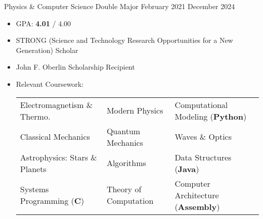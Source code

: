
\entrySubtitle
	{Physics \& Computer Science Double Major}
	{February 2021}
	{December 2024}

\vspace*{-0.35cm}
\begin{itemize}
	\setlength\itemsep{-0.1cm}
	\item GPA: \textbf{4.01} / 4.00
	
	\item STRONG (Science and Technology Research Opportunities for a New Generation) Scholar

	\item John F. Oberlin Scholarship Recipient
	
	\item Relevant Coursework:
	
		\begin{tabular}{lll}
			Electromagnetism \& Thermo. & Modern Physics & Computational Modeling (\textbf{Python}) \\
			Classical Mechanics & Quantum Mechanics & Waves \& Optics \\
			Astrophysics: Stars \& Planets & Algorithms & Data Structures (\textbf{Java}) \\
			Systems Programming (\textbf{C}) & Theory of Computation & Computer Architecture (\textbf{Assembly}) \\
		\end{tabular}
\end{itemize}
